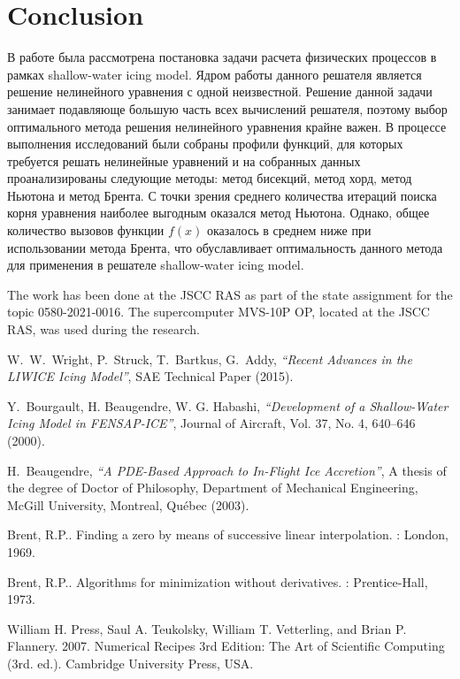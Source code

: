 \documentclass[
11pt,%
tightenlines,%
twoside,%
onecolumn,%
nofloats,%
nobibnotes,%
nofootinbib,%
superscriptaddress,%
noshowpacs,%
centertags]%
{revtex4}
\begin{document}
\section{Conclusion}

В работе была рассмотрена постановка задачи расчета физических процессов в рамках shallow-water icing model.
Ядром работы данного решателя является решение нелинейного уравнения с одной неизвестной.
Решение данной задачи занимает подавляюще большую часть всех вычислений решателя, поэтому выбор оптимального метода решения нелинейного уравнения крайне важен.
В процессе выполнения исследований были собраны профили функций, для которых требуется решать нелинейные уравнений и на собранных данных проанализированы следующие методы: метод бисекций, метод хорд, метод Ньютона и метод Брента.
С точки зрения среднего количества итераций поиска корня уравнения наиболее выгодным оказался метод Ньютона.
Однако, общее количество вызовов функции $f(x)$ оказалось в среднем ниже при использовании метода Брента, что обуславливает оптимальность данного метода для применения в решателе shallow-water icing model.

\begin{acknowledgments}
The work has been done at the JSCC RAS as part of the state assignment for the topic 0580-2021-0016.
The supercomputer MVS-10P OP, located at the JSCC RAS, was used during the research.
\end{acknowledgments}

\begin{thebibliography}{99}

W.~W.~Wright, P.~Struck, T.~Bartkus, G.~Addy, {\it ``Recent Advances in the LIWICE Icing Model''}, SAE Technical Paper (2015).

Y.~Bourgault, H. Beaugendre, W. G. Habashi, {\it ``Development of a Shallow-Water Icing Model in FENSAP-ICE''}, Journal of Aircraft, Vol. 37, No. 4, 640--646 (2000).

H.~Beaugendre, {\it ``A PDE-Based Approach to In-Flight Ice Accretion''}, A thesis of the degree of Doctor of Philosophy, Department of Mechanical Engineering, McGill University, Montreal, Qu\'ebec (2003).

Brent, R.P.. Finding a zero by means of successive linear interpolation. : London, 1969.

Brent, R.P.. Algorithms for minimization without derivatives. : Prentice-Hall, 1973.

William H. Press, Saul A. Teukolsky, William T. Vetterling, and Brian P. Flannery. 2007. Numerical Recipes 3rd Edition: The Art of Scientific Computing (3rd. ed.). Cambridge University Press, USA.


\end{thebibliography}
\end{document}

